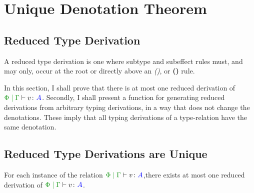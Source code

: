 \documentclass{report}
\begin{document}
\chapter{Unique Denotation Theorem}

\section{Reduced Type Derivation}
    A reduced type derivation is one where subtype and subeffect rules must, and may only, occur at the root or directly above an \textit{(\vif)}, or \textbf{(\vapply)} rule.
    
    In this section, I shall prove that there is at most one reduced derivation of $\gpetyperelation{v}{A}$. Secondly, I shall present a function for generating reduced derivations from arbitrary typing derivations, in a way that does not change the denotations. These imply that all typing derivations of a type-relation have the same denotation.
    
    \section{Reduced Type Derivations are Unique}

\begin{theorem}
        For each instance of the relation $\gpetyperelation{v}{A}$,there exists at most one reduced derivation of  $\gpetyperelation{v}{A}$. 
\end{theorem}
    
\end{document}
